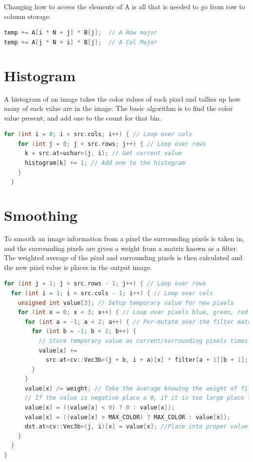 \documentclass[a4paper]{article}
\begin{document}
Changing how to access the elements of A is all that is needed to go from row to column storage.

\begin{lstlisting}[language=C++]
temp += A[i * N + j] * B[j];  // A Row major
temp += A[j * N + i] * B[j];  // A Col Major
\end{lstlisting}


\section*{Histogram}

A histogram of an image takes the color values of each pixel and tallies up how many of each value are in the image. The basic algorithm is to find the color value present, and add one to the count for that bin. 
\begin{lstlisting}[language=C++]
  for (int i = 0; i < src.cols; i++) { // Loop over cols
    for (int j = 0; j < src.rows; j++) { // Loop over rows
      k = src.at<uchar>(j, i); // Get current value
      histogram[k] += 1; // Add one to the histogram 
    }
  }
\end{lstlisting}

\section*{Smoothing}

To smooth an image information from a pixel the surrounding pixels is taken in, and the surrounding pixels are given a weight from a matrix known as a filter. The weighted average of the pixel and surrounding pixels is then calculated and the new pixel value is places in the output image.

\begin{lstlisting}[language=C++]
for (int j = 1; j < src.rows - 1; j++) { // Loop over rows
  for (int i = 1; i < src.cols - 1; i++) { // Loop over cols
    unsigned int value[3]; // Setup temporary value for new pixels
    for (int x = 0; x < 3; x++) { // Loop over pixels blue, green, red
      for (int a = -1; a < 2; a++) { // Per-mutate over the filter matrix
        for (int b = -1; b < 2; b++) {
          // Store temporary value as current/surrounding pixels times filter
          value[x] +=
            src.at<cv::Vec3b>(j + b, i + a)[x] * filter[a + 1][b + 1];
        }
      }
      value[x] /= weight; // Take the average knowing the weight of filter
      // If the value is negative place a 0, if it is too large place largest pixel value (265)
      value[x] = ((value[x] < 0) ? 0 : value[x]); 
      value[x] = ((value[x] > MAX_COLOR) ? MAX_COLOR : value[x]); 
      dst.at<cv::Vec3b>(j, i)[x] = value[x]; //Place into proper value of new image
    }
  }
}
\end{lstlisting}
\end{document}
